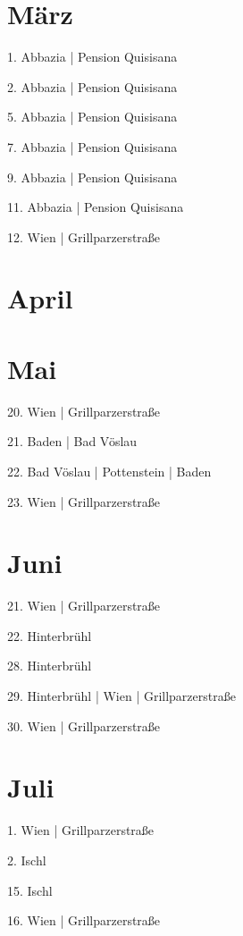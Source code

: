 \documentclass[twoside=false,titlepage=false,open=any, parskip=never, fontsize=10pt, headings=small, chapterprefix=false, appendixprefix=false, DIV=15]{scrbook}
\begin{document}
\begin{multicols}{3}
            \section*{März}
            1. Abbazia | Pension Quisisana\par
            2. Abbazia | Pension Quisisana\par
            5. Abbazia | Pension Quisisana\par
            7. Abbazia | Pension Quisisana\par
            9. Abbazia | Pension Quisisana\par
            11. Abbazia | Pension Quisisana\par
            12. Wien | Grillparzerstraße\par
            \section*{April}
            \section*{Mai}
            20. Wien | Grillparzerstraße\par
            21. Baden | Bad Vöslau\par
            22. Bad Vöslau | Pottenstein | Baden\par
            23. Wien | Grillparzerstraße\par
            \section*{Juni}
            21. Wien | Grillparzerstraße\par
            22. Hinterbrühl\par
            28. Hinterbrühl\par
            29. Hinterbrühl | Wien | Grillparzerstraße\par
            30. Wien | Grillparzerstraße\par
            \section*{Juli}
            1. Wien | Grillparzerstraße\par
            2. Ischl\par
            15. Ischl\par
            16. Wien | Grillparzerstraße\par

\end{multicols}
\end{document}
